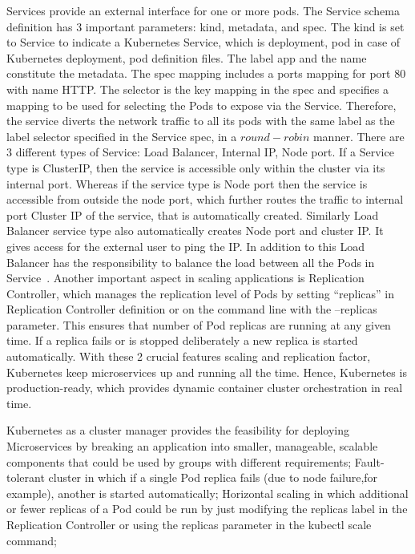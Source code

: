 Services provide an external interface for one or more pods. The
Service schema definition has 3 important parameters: kind, metadata,
and spec. The kind is set to Service to indicate a Kubernetes Service,
which is deployment, pod in case of Kubernetes deployment, pod
definition files. The label app and the name constitute the
metadata. The spec mapping includes a ports mapping for port 80 with
name HTTP. The selector is the key mapping in the spec and specifies a
mapping to be used for selecting the Pods to expose via the
Service. Therefore, the service diverts the network traffic to all its
pods with the same label as the label selector specified in the
Service spec, in a $round-robin$ manner. There are 3 different types of
Service: Load Balancer, Internal IP, Node port. If a Service type is
ClusterIP, then the service is accessible only within the cluster via
its internal port. Whereas if the service type is Node port then the
service is accessible from outside the node port, which further routes
the traffic to internal port Cluster IP of the service, that is
automatically created. Similarly Load Balancer service type also
automatically creates Node port and cluster IP. It gives access for
the external user to ping the IP. In addition to this Load Balancer
has the responsibility to balance the load between all the Pods in
Service~\cite{hid-sp18-602-services}. Another important aspect in
scaling applications is Replication Controller, which manages the
replication level of Pods by setting “replicas” in Replication
Controller definition or on the command line with the –replicas
parameter. This ensures that number of Pod replicas are running at any
given time. If a replica fails or is stopped deliberately a new
replica is started automatically. With these 2 crucial features
scaling and replication factor, Kubernetes keep microservices up and
running all the time. Hence, Kubernetes is production-ready, which
provides dynamic container cluster orchestration in real time.

Kubernetes as a cluster manager provides the feasibility for deploying
Microservices by breaking an application into smaller, manageable,
scalable components that could be used by groups with different
requirements; Fault-tolerant cluster in which if a single Pod replica
fails (due to node failure,for example), another is started
automatically; Horizontal scaling in which additional or fewer
replicas of a Pod could be run by just modifying the replicas
label in the Replication Controller or using the replicas parameter
in the kubectl scale command;

